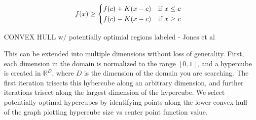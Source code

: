 \begin{equation}
    f(x) \ge \begin{dcases}
        f(c) + K(x-c) & \text{if  } x \le c \\
        f(c) - K(x-c) & \text{if  } x \ge c
    \end{dcases}
    \label{eq:direct-lipschitz}
\end{equation}

\begin{center}
    \Huge{CONVEX HULL w/ potentially optimial regions labeled - Jones et al}
\end{center}

This can be extended into multiple dimensions without loss of generality. First, each dimension in the domain is normalized to the range $[0,1]$, and a hypercube is created in $\mathbb{R}^D$, where $D$ is the dimension of the domain you are searching. The first iteration trisects this hybercube along an arbitrary dimension, and further iterations trisect along the largest dimension of the hypercube. We select potentially optimal hypercubes by identifying points along the lower convex hull of the graph plotting hypercube size vs center point function value.
